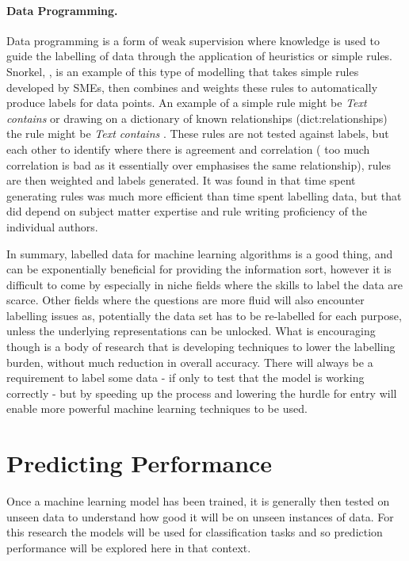 \paragraph{Data Programming.}  Data programming is a form of weak supervision where knowledge is used to guide the labelling of data through the application of heuristics or simple rules. Snorkel, \parencite{ratner2017snorkel}, is an example of this type of modelling that takes simple rules developed by SMEs, then combines and weights these rules to automatically produce labels for data points. An example of a simple rule might be \emph{Text contains } or drawing on a dictionary of known relationships (dict:relationships) the rule might be \emph{Text contains }. These rules are not tested against labels, but each other to identify where there is agreement and correlation ( too much correlation is bad as it essentially over emphasises the same relationship), rules are then weighted and labels generated. It was found in \textcite{ratner2017snorkel} that time spent generating rules was much more efficient than time spent labelling data, but that did depend on subject matter expertise and rule writing proficiency of the individual authors.


In summary, labelled data for machine learning algorithms is a good thing, and can be exponentially beneficial for providing the information sort, however it is difficult to come by especially in niche fields where the skills to label the data are scarce. Other fields where the questions are more fluid will also encounter labelling issues as, potentially the data set has to be re-labelled for each purpose, unless the underlying representations can be unlocked. What is encouraging though is a body of research that is developing techniques to lower the labelling burden, without much reduction in overall accuracy. There will always be a requirement to label some data - if only to test that the model is working correctly - but by speeding up the process and lowering the hurdle for entry will enable more powerful machine learning techniques to be used.

\section{Predicting Performance} Once a machine learning model has been trained, it is generally then tested on unseen data to understand how good it will be on unseen instances of data. For this research the models will be used for classification tasks and so prediction performance will be explored here in that context.  

